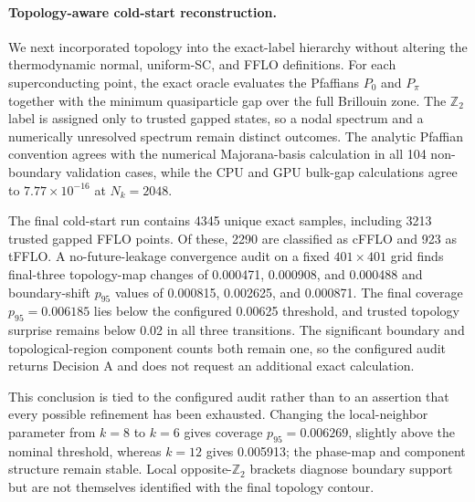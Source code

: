 \paragraph{Topology-aware cold-start reconstruction.}
We next incorporated topology into the exact-label hierarchy without altering
the thermodynamic normal, uniform-SC, and FFLO definitions. For each
superconducting point, the exact oracle evaluates the Pfaffians $P_0$ and
$P_\pi$ together with the minimum quasiparticle gap over the full Brillouin
zone. The $\mathbb{Z}_2$ label is assigned only to trusted gapped states, so a
nodal spectrum and a numerically unresolved spectrum remain distinct outcomes.
The analytic Pfaffian convention agrees with the numerical Majorana-basis
calculation in all 104 non-boundary validation cases, while the CPU and GPU
bulk-gap calculations agree to $7.77\times10^{-16}$ at $N_k=2048$.

The final cold-start run contains 4345 unique exact samples, including 3213
trusted gapped FFLO points. Of these, 2290 are classified as cFFLO and 923 as
tFFLO. A no-future-leakage convergence audit on a fixed $401\times401$ grid
finds final-three topology-map changes of 0.000471, 0.000908, and 0.000488 and
boundary-shift $p_{95}$ values of 0.000815, 0.002625, and 0.000871. The final
coverage $p_{95}=0.006185$ lies below the configured 0.00625 threshold, and
trusted topology surprise remains below 0.02 in all three transitions. The
significant boundary and topological-region component counts both remain one,
so the configured audit returns Decision A and does not request an additional
exact calculation.

This conclusion is tied to the configured audit rather than to an assertion
that every possible refinement has been exhausted. Changing the local-neighbor
parameter from $k=8$ to $k=6$ gives coverage $p_{95}=0.006269$, slightly above
the nominal threshold, whereas $k=12$ gives 0.005913; the phase-map and
component structure remain stable. Local opposite-$\mathbb{Z}_2$ brackets
diagnose boundary support but are not themselves identified with the final
topology contour.

